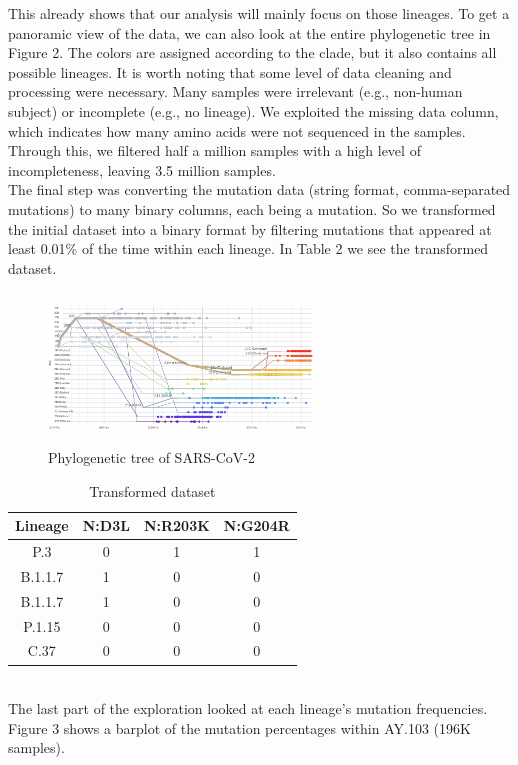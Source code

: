 \documentclass[twoside,twocolumn]{article}
\begin{document}
	This already shows that our analysis will mainly focus on those lineages. To get a panoramic view of the data, we can also look at the entire phylogenetic tree in Figure 2. The colors are assigned according to the clade, but it also contains all possible lineages. It is worth noting that some level of data cleaning and processing were necessary. Many samples were irrelevant (e.g., non-human subject) or incomplete (e.g., no lineage). We exploited the missing data column, which indicates how many amino acids were not sequenced in the samples. Through this, we filtered half a million samples with a high level of incompleteness, leaving 3.5 million samples. \\
	The final step was converting the mutation data (string format, comma-separated mutations) to many binary columns, each being a mutation. So we transformed the initial dataset into a binary format by filtering mutations that appeared at least 0.01\% of the time within each lineage. In Table 2 we see the transformed dataset.
	\begin{figure}[h]
		\caption{Phylogenetic tree of SARS-CoV-2}
		\label{tree}
		\centering
		\includegraphics[width=70mm, height=40mm]{covidtree.png}
	\end{figure}
	\begin{table}
		\caption{Transformed dataset}
		\centering
		\renewcommand{\arraystretch}{1.2} %
		\begin{tabular}{| c | c | c | c | }
			\hline
			Lineage & N:D3L & N:R203K & N:G204R\\
			\hline
			P.3& 0 & 1 & 1 \\
			B.1.1.7 & 1 & 0&0 \\
			B.1.1.7 & 1 & 0&0 \\
			P.1.15 & 0 & 0 &0\\
			C.37 & 0 & 0 &0\\
			\hline
		\end{tabular}
	\end{table}
	\\The last part of the exploration looked at each lineage's mutation frequencies. Figure 3 shows a barplot of the mutation percentages within AY.103 (196K samples).
\end{document}
